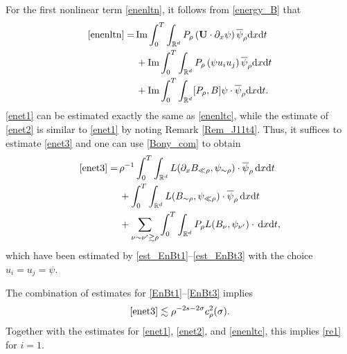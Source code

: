 \documentclass[11pt,letterpaper,reqno]{amsart}
\numberwithin{equation}{section}
\theoremstyle{definition}
\theoremstyle{remark}
\begin{document}
For the first nonlinear term \eqref{enenltn}, it follows from \eqref{energy_B} that
\begin{align}
	\eqref{enenltn}
	=&\,  \mathrm{Im} \int_0^T \int_{\mathbb{R}^{d}}    P_{\rho} \left( \mathbf{U} \cdot\partial_x \psi\right) \overline{\psi}_{\rho}  \mathrm{ d} x \mathrm{ d} t\label{enet1}\\
	&\,+\mathrm{Im} \int_0^T \int_{\mathbb{R}^{d}}    P_{\rho} \left( \psi  u_i u_j  \right) \overline{\psi}_{\rho}  \mathrm{ d} x \mathrm{ d} t\label{enet2}\\
	&\,+\mathrm{Im} \int_0^T \int_{\mathbb{R}^{d}}     [P_{\rho},B] \psi  \cdot  \overline{\psi}_{\rho}  \mathrm{ d} x \mathrm{ d} t. \label{enet3}
\end{align}
\eqref{enet1} can be estimated exactly the same as \eqref{enenltc}, while the estimate of \eqref{enet2} is similar to \eqref{enet1} by noting Remark \ref{Rem_J11t4}.  
Thus, it suffices to estimate
 \eqref{enet3} and one can use \eqref{Bony_com} to obtain
\begin{align}
\eqref{enet3}
	=&\,\rho^{-1}   \int_0^T \int_{\mathbb{R}^{d}}    L(\partial_x B_{\ll \rho },  \psi_{\sim \rho } ) \cdot   \overline{\psi}_{\rho}  \,\mathrm{ d} x \mathrm{ d} t \label{EnBt1}\\
	&\,+     \int_0^T \int_{\mathbb{R}^{d}}    L( B_{ \sim \rho }, \psi_{\ll \rho  } )\cdot \overline{\psi}_{\rho}  \,\mathrm{ d} x \mathrm{ d} t\label{EnBt2}\\
	&\,+ \sum_{\nu\sim \nu^\prime\gtrsim \rho }   \int_0^T \int_{\mathbb{R}^{d}}  P_\rho L(B_{ \nu}, \psi_{\nu^\prime })\cdot  \, \mathrm{ d} x \mathrm{ d} t, \label{EnBt3}
\end{align}
which have been estimated by \eqref{est_EnBt1}--\eqref{est_EnBt3} with the choice \(u_i=u_j=\psi\).
 

The combination of estimates for \eqref{EnBt1}--\eqref{EnBt3} implies
\begin{align} \label{En_estB}
\eqref{enet3}\lesssim \rho ^{-2s-2\sigma}c_{\rho }^2 (\sigma).
\end{align}
Together with the estimates for \eqref{enet1}, \eqref{enet2}, and \eqref{enenltc}, this implies \eqref{re1} for $ i=1 $.  
\end{document}
